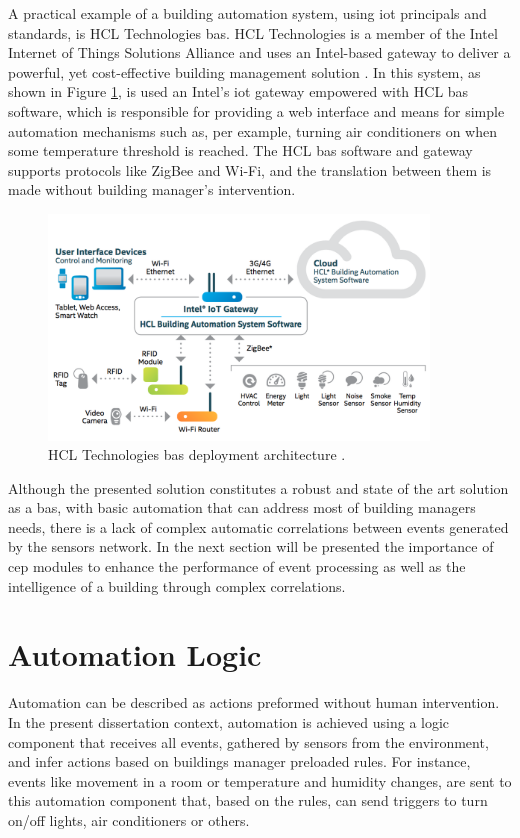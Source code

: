 A practical example of a building automation system, using \ac{iot} principals and standards, is HCL Technologies \ac{bas}. HCL Technologies is a member of the Intel Internet of Things Solutions Alliance \cite{intel} and uses an Intel-based gateway to deliver a powerful, yet cost-effective building management solution \cite{hcl}. In this system, as shown in Figure \ref{fig:intel}, is used an Intel's \ac{iot} gateway empowered with HCL \ac{bas} software, which is responsible for providing a web interface and means for simple automation mechanisms such as, per example, turning air conditioners on when some temperature threshold is reached. The HCL \ac{bas} software and gateway supports protocols like ZigBee and Wi-Fi, and the translation between them is made without building manager's intervention.


\begin{figure}[H]
	\centering
	\includegraphics[width=0.9\textwidth]{figures/intelhclarch.png}
	\caption{HCL Technologies \ac{bas} deployment architecture \cite{hcl}.}
	\label{fig:intel}
\end{figure}

Although the presented solution constitutes a robust and state of the art solution as a \ac{bas}, with basic automation that can address most of building managers needs, there is a lack of complex automatic correlations between events generated by the sensors network. In the next section will be presented the importance of \acf{cep} modules to enhance the performance of event processing as well as the intelligence of a building through complex correlations.


\section{Automation Logic}
Automation can be described as actions preformed without human intervention. In the present dissertation context, automation is achieved using a logic component that receives all events, gathered by sensors from the environment, and infer actions based on buildings manager preloaded rules. For instance, events like movement in a room or temperature and humidity changes, are sent to this automation component that, based on the rules, can send triggers to turn on/off lights, air conditioners or others.

